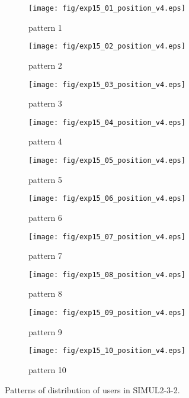 \begin{figure}
	\begin{center}
		\begin{subfigure}[b]{0.32\textwidth}
			\texttt{[image: fig/exp15\_01\_position\_v4.eps]}
			\caption{pattern 1}
			\label{figure:simul2_3_2_a}
		\end{subfigure}
		\begin{subfigure}[b]{0.32\textwidth}
			\texttt{[image: fig/exp15\_02\_position\_v4.eps]}
			\caption{pattern 2}
			\label{figure:simul2_3_2_b}
		\end{subfigure}
		\begin{subfigure}[b]{0.32\textwidth}
			\texttt{[image: fig/exp15\_03\_position\_v4.eps]}
			\caption{pattern 3}
			\label{figure:simul2_3_2_c}
		\end{subfigure}
		\begin{subfigure}[b]{0.32\textwidth}
			\texttt{[image: fig/exp15\_04\_position\_v4.eps]}
			\caption{pattern 4}
			\label{figure:simul2_3_2_d}
		\end{subfigure}
		\begin{subfigure}[b]{0.32\textwidth}
			\texttt{[image: fig/exp15\_05\_position\_v4.eps]}
			\caption{pattern 5}
			\label{figure:simul2_3_2_e}
		\end{subfigure}
		\begin{subfigure}[b]{0.32\textwidth}
			\texttt{[image: fig/exp15\_06\_position\_v4.eps]}
			\caption{pattern 6}
			\label{figure:simul2_3_2_f}
		\end{subfigure}
		\begin{subfigure}[b]{0.32\textwidth}
			\texttt{[image: fig/exp15\_07\_position\_v4.eps]}
			\caption{pattern 7}
			\label{figure:simul2_3_2_g}
		\end{subfigure}
		\begin{subfigure}[b]{0.32\textwidth}
			\texttt{[image: fig/exp15\_08\_position\_v4.eps]}
			\caption{pattern 8}
			\label{figure:simul2_3_2_h}
		\end{subfigure}
		\begin{subfigure}[b]{0.32\textwidth}
			\texttt{[image: fig/exp15\_09\_position\_v4.eps]}
			\caption{pattern 9}
			\label{figure:simul2_3_2_i}
		\end{subfigure}
		\begin{subfigure}[b]{0.32\textwidth}
			\texttt{[image: fig/exp15\_10\_position\_v4.eps]}
			\caption{pattern 10}
			\label{figure:simul2_3_2_j}
		\end{subfigure}
		\caption{Patterns of distribution of users in SIMUL2-3-2.}
		\label{figure:simul2_3_2_p}
	\end{center}
\end{figure}

